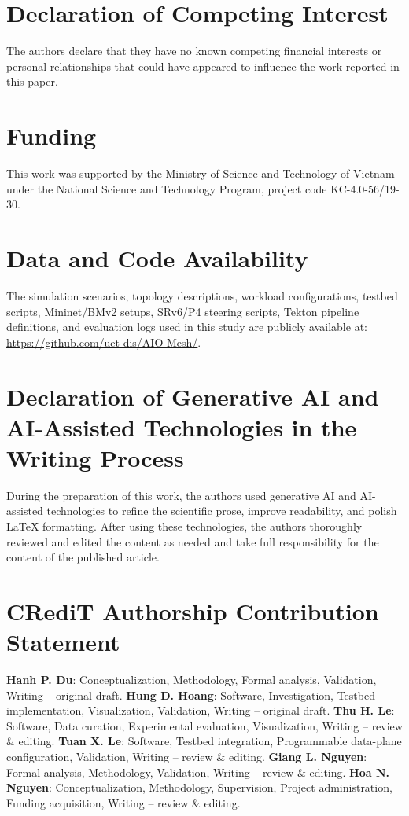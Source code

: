 \documentclass[final,5p]{elsarticle}
\begin{document}

\section*{Declaration of Competing Interest}
\noindent The authors declare that they have no known competing financial interests or personal relationships that could have appeared to influence the work reported in this paper.


\section*{Funding}
This work was supported by the Ministry of Science and Technology of Vietnam under the National Science and Technology Program, project code KC-4.0-56/19-30.

\section*{Data and Code Availability}
The simulation scenarios, topology descriptions, workload configurations, testbed scripts, Mininet/BMv2 setups, SRv6/P4 steering scripts, Tekton pipeline definitions, and evaluation logs used in this study are publicly available at:
\url{https://github.com/uet-dis/AIO-Mesh/}.

\section*{Declaration of Generative AI and AI-Assisted Technologies in the Writing Process}
During the preparation of this work, the authors used generative AI and AI-assisted technologies to refine the scientific prose, improve readability, and polish LaTeX formatting. After using these technologies, the authors thoroughly reviewed and edited the content as needed and take full responsibility for the content of the published article.

\section*{CRediT Authorship Contribution Statement}
\textbf{Hanh P. Du}: Conceptualization, Methodology, Formal analysis, Validation, Writing -- original draft.
\textbf{Hung D. Hoang}: Software, Investigation, Testbed implementation, Visualization, Validation, Writing -- original draft.
\textbf{Thu H. Le}: Software, Data curation, Experimental evaluation, Visualization, Writing -- review \& editing.
\textbf{Tuan X. Le}: Software, Testbed integration, Programmable data-plane configuration, Validation, Writing -- review \& editing.
\textbf{Giang L. Nguyen}: Formal analysis, Methodology, Validation, Writing -- review \& editing.
\textbf{Hoa N. Nguyen}: Conceptualization, Methodology, Supervision, Project administration, Funding acquisition, Writing -- review \& editing.




\end{document}
